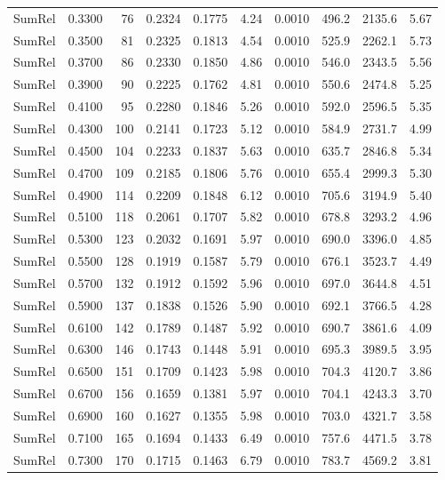 {\begin{longtable}{lrrrrrrrrr}
  SumRel & 0.3300 & 76 & 0.2324 & 0.1775 & 4.24 & 0.0010 & 496.2 & 2135.6 & 5.67 \\
  SumRel & 0.3500 & 81 & 0.2325 & 0.1813 & 4.54 & 0.0010 & 525.9 & 2262.1 & 5.73 \\
  SumRel & 0.3700 & 86 & 0.2330 & 0.1850 & 4.86 & 0.0010 & 546.0 & 2343.5 & 5.56 \\
  SumRel & 0.3900 & 90 & 0.2225 & 0.1762 & 4.81 & 0.0010 & 550.6 & 2474.8 & 5.25 \\
  SumRel & 0.4100 & 95 & 0.2280 & 0.1846 & 5.26 & 0.0010 & 592.0 & 2596.5 & 5.35 \\
  SumRel & 0.4300 & 100 & 0.2141 & 0.1723 & 5.12 & 0.0010 & 584.9 & 2731.7 & 4.99 \\
  SumRel & 0.4500 & 104 & 0.2233 & 0.1837 & 5.63 & 0.0010 & 635.7 & 2846.8 & 5.34 \\
  SumRel & 0.4700 & 109 & 0.2185 & 0.1806 & 5.76 & 0.0010 & 655.4 & 2999.3 & 5.30 \\
  SumRel & 0.4900 & 114 & 0.2209 & 0.1848 & 6.12 & 0.0010 & 705.6 & 3194.9 & 5.40 \\
  SumRel & 0.5100 & 118 & 0.2061 & 0.1707 & 5.82 & 0.0010 & 678.8 & 3293.2 & 4.96 \\
  SumRel & 0.5300 & 123 & 0.2032 & 0.1691 & 5.97 & 0.0010 & 690.0 & 3396.0 & 4.85 \\
  SumRel & 0.5500 & 128 & 0.1919 & 0.1587 & 5.79 & 0.0010 & 676.1 & 3523.7 & 4.49 \\
  SumRel & 0.5700 & 132 & 0.1912 & 0.1592 & 5.96 & 0.0010 & 697.0 & 3644.8 & 4.51 \\
  SumRel & 0.5900 & 137 & 0.1838 & 0.1526 & 5.90 & 0.0010 & 692.1 & 3766.5 & 4.28 \\
  SumRel & 0.6100 & 142 & 0.1789 & 0.1487 & 5.92 & 0.0010 & 690.7 & 3861.6 & 4.09 \\
  SumRel & 0.6300 & 146 & 0.1743 & 0.1448 & 5.91 & 0.0010 & 695.3 & 3989.5 & 3.95 \\
  SumRel & 0.6500 & 151 & 0.1709 & 0.1423 & 5.98 & 0.0010 & 704.3 & 4120.7 & 3.86 \\
  SumRel & 0.6700 & 156 & 0.1659 & 0.1381 & 5.97 & 0.0010 & 704.1 & 4243.3 & 3.70 \\
  SumRel & 0.6900 & 160 & 0.1627 & 0.1355 & 5.98 & 0.0010 & 703.0 & 4321.7 & 3.58 \\
  SumRel & 0.7100 & 165 & 0.1694 & 0.1433 & 6.49 & 0.0010 & 757.6 & 4471.5 & 3.78 \\
  SumRel & 0.7300 & 170 & 0.1715 & 0.1463 & 6.79 & 0.0010 & 783.7 & 4569.2 & 3.81 \\

\end{longtable}}
